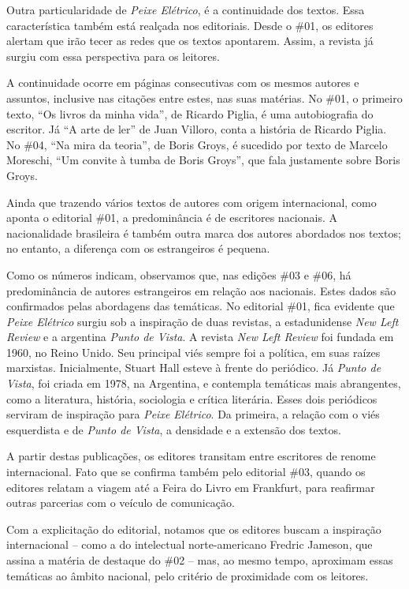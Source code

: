 \documentclass[portuguese]{textolivre}
\begin{document}
Outra particularidade de \textit{Peixe Elétrico}, é a continuidade dos textos. Essa característica também está realçada nos editoriais. Desde o \#01, os editores alertam que irão tecer as redes que os textos apontarem. Assim, a revista já surgiu com essa perspectiva para os leitores.

A continuidade ocorre em páginas consecutivas com os mesmos autores e assuntos, inclusive nas citações entre estes, nas suas matérias. No \#01, o primeiro texto, “Os livros da minha vida”, de Ricardo Piglia, é uma autobiografia do escritor. Já “A arte de ler” de Juan Villoro, conta a história de Ricardo Piglia. No \#04, “Na mira da teoria”, de Boris Groys, é sucedido por texto de Marcelo Moreschi, “Um convite à tumba de Boris Groys”, que fala justamente sobre Boris Groys.

Ainda que trazendo vários textos de autores com origem internacional, como aponta o editorial \#01, a predominância é de escritores nacionais. A nacionalidade brasileira é também outra marca dos autores abordados nos textos; no entanto, a diferença com os estrangeiros é pequena.

Como os números indicam, observamos que, nas edições \#03 e \#06, há predominância de autores estrangeiros em relação aos nacionais. Estes dados são confirmados pelas abordagens das temáticas. No editorial \#01, fica evidente que \textit{Peixe Elétrico} surgiu sob a inspiração de duas revistas, a estadunidense \textit{New Left Review} e a argentina \textit{Punto de Vista}. A revista \textit{New Left Review} foi fundada em 1960, no Reino Unido. Seu principal viés sempre foi a política, em suas raízes marxistas. Inicialmente, Stuart Hall esteve à frente do periódico. Já \textit{Punto de Vista}, foi criada em 1978, na Argentina, e contempla temáticas mais abrangentes, como a literatura, história, sociologia e crítica literária. Esses dois periódicos serviram de inspiração para \textit{Peixe Elétrico}. Da primeira, a relação com o viés esquerdista e de \textit{Punto de Vista}, a densidade e a extensão dos textos.

A partir destas publicações, os editores transitam entre escritores de renome internacional. Fato que se confirma também pelo editorial \#03, quando os editores relatam a viagem até a Feira do Livro em Frankfurt, para reafirmar outras parcerias com o veículo de comunicação.

Com a explicitação do editorial, notamos que os editores buscam a inspiração internacional – como a do intelectual norte-americano Fredric Jameson, que assina a matéria de destaque do \#02 – mas, ao mesmo tempo, aproximam essas temáticas ao âmbito nacional, pelo critério de proximidade com os leitores.
\end{document}
